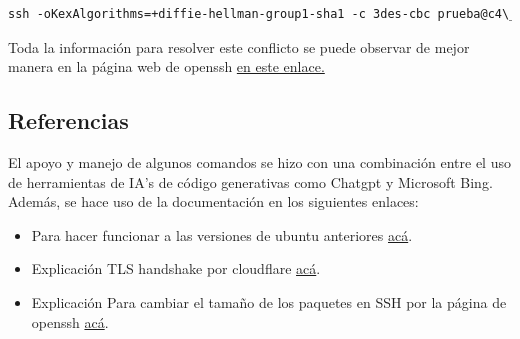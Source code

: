 \documentclass[letter,12pt]{article}
\newcounter{codecount}
\begin{document}
\begin{enumerate}
\label{code:parte3.1}
\begin{lstlisting}[language=Dockerfile, caption={Terminal de otro contenedor (c3 en este caso)}]
ssh -oKexAlgorithms=+diffie-hellman-group1-sha1 -c 3des-cbc prueba@c4\_s1

\end{lstlisting}

Toda la información para resolver este conflicto se puede observar de mejor manera en la página web de openssh \href{https://www.openssh.com/legacy.html}{en este enlace.}

\end{enumerate}


\clearpage


\subsection*{Referencias}

El apoyo y manejo de algunos comandos se hizo con una combinación entre el uso de herramientas de IA's de código generativas como Chatgpt y Microsoft Bing. Además, se hace uso de la documentación en los siguientes enlaces:



\begin{itemize}
    \item Para hacer funcionar a las versiones de ubuntu anteriores \href{https://help.ubuntu.com/community/EOLUpgrades}{acá}.

    \item Explicación TLS handshake por cloudflare \href{https://www.cloudflare.com/learning/ssl/what-happens-in-a-tls-handshake/}{acá}.

    \item Explicación Para cambiar el tamaño de los paquetes en SSH por la página de openssh \href{https://www.openssh.com/legacy.html}{acá}.



\end{itemize}
\end{document}
